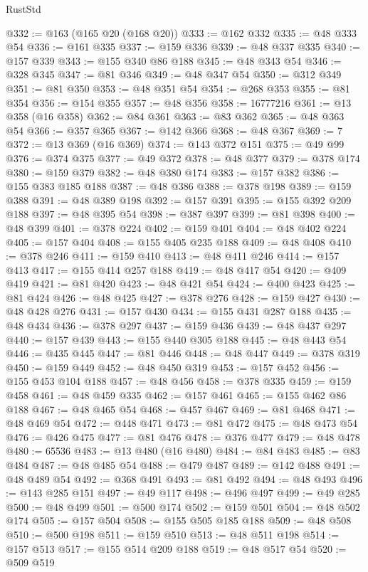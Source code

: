 \begin{lexlean}{RustStd}
\begin{coremodule}
@332 := @163 (@165 @20 (@168 @20))
@333 := @162 @332
@335 := @48 @333 @54
@336 := @161 @335
@337 := @159 @336
@339 := @48 @337 @335
@340 := @157 @339
@343 := @155 @340 @86 @188
@345 := @48 @343 @54
@346 := @328 @345
@347 := @81 @346
@349 := @48 @347 @54
@350 := @312 @349
@351 := @81 @350
@353 := @48 @351 @54
@354 := @268 @353
@355 := @81 @354
@356 := @154 @355
@357 := @48 @356
@358 := 16777216
@361 := @13 @358 (@16 @358)
@362 := @84 @361
@363 := @83 @362
@365 := @48 @363 @54
@366 := @357 @365
@367 := @142 @366
@368 := @48 @367
@369 := 7
@372 := @13 @369 (@16 @369)
@374 := @143 @372 @151
@375 := @49 @99
@376 := @374 @375
@377 := @49 @372
@378 := @48 @377
@379 := @378 @174
@380 := @159 @379
@382 := @48 @380 @174
@383 := @157 @382
@386 := @155 @383 @185 @188
@387 := @48 @386
@388 := @378 @198
@389 := @159 @388
@391 := @48 @389 @198
@392 := @157 @391
@395 := @155 @392 @209 @188
@397 := @48 @395 @54
@398 := @387 @397
@399 := @81 @398
@400 := @48 @399
@401 := @378 @224
@402 := @159 @401
@404 := @48 @402 @224
@405 := @157 @404
@408 := @155 @405 @235 @188
@409 := @48 @408
@410 := @378 @246
@411 := @159 @410
@413 := @48 @411 @246
@414 := @157 @413
@417 := @155 @414 @257 @188
@419 := @48 @417 @54
@420 := @409 @419
@421 := @81 @420
@423 := @48 @421 @54
@424 := @400 @423
@425 := @81 @424
@426 := @48 @425
@427 := @378 @276
@428 := @159 @427
@430 := @48 @428 @276
@431 := @157 @430
@434 := @155 @431 @287 @188
@435 := @48 @434
@436 := @378 @297
@437 := @159 @436
@439 := @48 @437 @297
@440 := @157 @439
@443 := @155 @440 @305 @188
@445 := @48 @443 @54
@446 := @435 @445
@447 := @81 @446
@448 := @48 @447
@449 := @378 @319
@450 := @159 @449
@452 := @48 @450 @319
@453 := @157 @452
@456 := @155 @453 @104 @188
@457 := @48 @456
@458 := @378 @335
@459 := @159 @458
@461 := @48 @459 @335
@462 := @157 @461
@465 := @155 @462 @86 @188
@467 := @48 @465 @54
@468 := @457 @467
@469 := @81 @468
@471 := @48 @469 @54
@472 := @448 @471
@473 := @81 @472
@475 := @48 @473 @54
@476 := @426 @475
@477 := @81 @476
@478 := @376 @477
@479 := @48 @478
@480 := 65536
@483 := @13 @480 (@16 @480)
@484 := @84 @483
@485 := @83 @484
@487 := @48 @485 @54
@488 := @479 @487
@489 := @142 @488
@491 := @48 @489 @54
@492 := @368 @491
@493 := @81 @492
@494 := @48 @493
@496 := @143 @285 @151
@497 := @49 @117
@498 := @496 @497
@499 := @49 @285
@500 := @48 @499
@501 := @500 @174
@502 := @159 @501
@504 := @48 @502 @174
@505 := @157 @504
@508 := @155 @505 @185 @188
@509 := @48 @508
@510 := @500 @198
@511 := @159 @510
@513 := @48 @511 @198
@514 := @157 @513
@517 := @155 @514 @209 @188
@519 := @48 @517 @54
@520 := @509 @519

\end{coremodule}
\end{lexlean}
